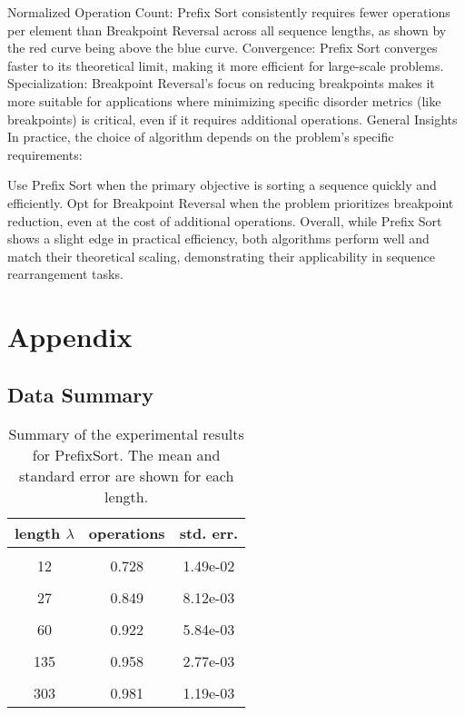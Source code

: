 \documentclass[
  11pt,
  a4paper,
]{article}
\begin{document}
Normalized Operation Count: Prefix Sort consistently requires fewer operations per element than Breakpoint Reversal across all sequence lengths, as shown by the red curve being above the blue curve.
Convergence: Prefix Sort converges faster to its theoretical limit, making it more efficient for large-scale problems.
Specialization: Breakpoint Reversal's focus on reducing breakpoints makes it more suitable for applications where minimizing specific disorder metrics (like breakpoints) is critical, even if it requires additional operations.
General Insights
In practice, the choice of algorithm depends on the problem's specific requirements:

Use Prefix Sort when the primary objective is sorting a sequence quickly and efficiently.
Opt for Breakpoint Reversal when the problem prioritizes breakpoint reduction, even at the cost of additional operations.
Overall, while Prefix Sort shows a slight edge in practical efficiency, both algorithms perform well and match their theoretical scaling, demonstrating their applicability in sequence rearrangement tasks.

\FloatBarrier

\setcounter{section}{0}
\renewcommand{\thesection}{\Alph{section}}

\section{Appendix}\label{appendix}

\subsection{Data Summary}\label{data-summary}

\begin{longtable}[t]{c|c|c}
\caption{\label{tab:data-summary}Summary of the experimental results for PrefixSort. The mean and standard error are shown for each length.\label{tab:PrefixSort}}\\
\hline
\textbf{length $\lambda$} & \textbf{operations} & \textbf{std. err.}\\
\hline
\cellcolor{gray!10}{8} & \cellcolor{gray!10}{0.708} & \cellcolor{gray!10}{2.19e-02}\\
12 & 0.728 & 1.49e-02\\
\cellcolor{gray!10}{18} & \cellcolor{gray!10}{0.833} & \cellcolor{gray!10}{1.36e-02}\\
27 & 0.849 & 8.12e-03\\
\cellcolor{gray!10}{40} & \cellcolor{gray!10}{0.908} & \cellcolor{gray!10}{6.49e-03}\\
60 & 0.922 & 5.84e-03\\
\cellcolor{gray!10}{90} & \cellcolor{gray!10}{0.944} & \cellcolor{gray!10}{4.12e-03}\\
135 & 0.958 & 2.77e-03\\
\cellcolor{gray!10}{202} & \cellcolor{gray!10}{0.974} & \cellcolor{gray!10}{1.90e-03}\\
303 & 0.981 & 1.19e-03\\
\hline
\end{longtable}
\end{document}
